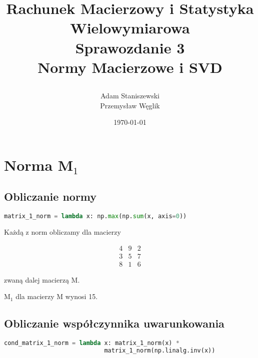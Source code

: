 \documentclass[12pt,a4paper,table]{article}
\begin{document}
    \title {
        Rachunek Macierzowy i Statystyka Wielowymiarowa \\
        Sprawozdanie 3 \\
        Normy Macierzowe i SVD

    }

    \author{
        Adam Staniszewski \\
        Przemysław Węglik
    }

    \date{\today}

    \maketitle

    \tableofcontents
    \newpage

    \section{Norma M$_1$}
    
    \subsection{Obliczanie normy}
    
    \begin{lstlisting}[language=Python]
    matrix_1_norm = lambda x: np.max(np.sum(x, axis=0))
    \end{lstlisting}

    Każdą z norm obliczamy dla macierzy 

    \[
    \begin{matrix}
    4 & 9 & 2 \\
    3 & 5 & 7 \\
    8 & 1 & 6
    \end{matrix}
    \]

    zwaną dalej macierzą M.

    \vspace{1em}
    M$_1$ dla macierzy M wynosi 15.
    
    \subsection{Obliczanie współczynnika uwarunkowania}
    
    \begin{lstlisting}[language=Python]
    cond_matrix_1_norm = lambda x: matrix_1_norm(x) * 
                            matrix_1_norm(np.linalg.inv(x))
    \end{lstlisting}
\end{document}
